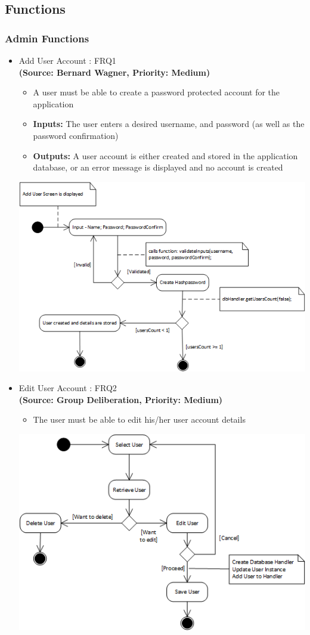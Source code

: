\subsection{Functions}
\subsubsection{Admin Functions}
\begin{itemize}
\item{Add User Account : FRQ1}\\
\textbf{(Source: Bernard Wagner, Priority: Medium)}
\begin{itemize}
\item A user must be able to create a password protected account for the application
\item \textbf{Inputs:} The user enters a desired username, and password (as well as the password confirmation)
\item \textbf{Outputs:} A user account is either created and stored in the application database, or an error message is displayed and no account is created
\end{itemize}
 \includegraphics[width=13cm]{diagrams/StateDiagrams/AddUserStateDiagram.png}
\newpage
\item{Edit User Account : FRQ2}\\
\textbf{(Source: Group Deliberation, Priority: Medium)}
\begin{itemize}
\item The user must be able to edit his/her user account details
\end{itemize}
 \includegraphics[width=13cm]{diagrams/StateDiagrams/EditUserStateDiagram.png}

\end{itemize}
